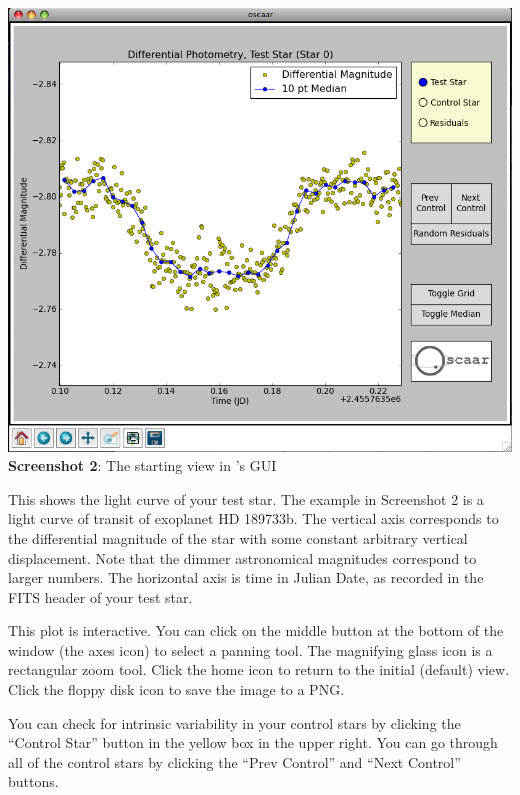 \documentclass{article}
\begin{document}
\begin{center}
\includegraphics[scale=0.4]{imgs/gui1.png}
{\small \textbf{Screenshot 2}: The starting view in \oscaar 's GUI}
\end{center}
\bigskip

This shows the light curve of your test star. The example in Screenshot 2 is a light curve of transit of exoplanet HD 189733b. The vertical axis corresponds to the differential magnitude of the star with some constant arbitrary vertical displacement. Note that the dimmer astronomical magnitudes correspond to larger numbers. The horizontal axis is time in Julian Date, as recorded in the FITS header of your test star. 

This plot is interactive. You can click on the middle button at the bottom of the window (the axes icon) to select a panning tool. The magnifying glass icon is a rectangular zoom tool. Click the home icon to return to the initial (default) view. Click the floppy disk icon to save the image to a PNG. 

You can check for intrinsic variability in your control stars by clicking the ``Control Star'' button in the yellow box in the upper right. You can go through all of the control stars by clicking the ``Prev Control'' and ``Next Control'' buttons.  \\
\end{document}
